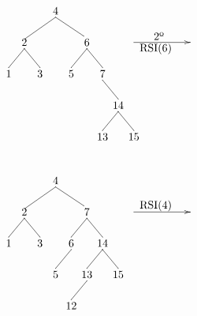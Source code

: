 \documentclass[10pt,a4paper,spanish]{report}
\begin{document}
\begin{minipage}{0.5\textwidth}
\[\begin{xy}
,(33,-8)*+=<10mm>[]\txt<2cm>{2º}
,(32,-12)*+=<20mm>[]\txt<2cm>{RSI(6)}
,(0,0)*+=<10mm>[]\txt<2cm>{4}
,(-10,-10)*+=<10mm>[]\txt<2cm>{2}
,(10,-10)*+=<10mm>[]\txt<2cm>{6}
,(-15,-20)*+=<10mm>[]\txt<2cm>{1}
,(-5,-20)*+=<10mm>[]\txt<2cm>{3}
,(5,-20)*+=<10mm>[]\txt<2cm>{5}
,(15,-20)*+=<10mm>[]\txt<2cm>{7}
,(20,-30)*+=<10mm>[]\txt<2cm>{14}
,(15,-40)*+=<10mm>[]\txt<2cm>{13}
,(25,-40)*+=<10mm>[]\txt<2cm>{15}

\ar@{->} (25,-10);(43,-10)
\ar@{-} (0,-2);(-10,-9) %
\ar@{-} (0,-2);(9,-8) %
\ar@{-} (-10,-12);(-15,-18) %
\ar@{-} (10,-12);(5,-18) %
\ar@{-} (10,-12);(15,-18) %
\ar@{-} (-10,-12);(-5,-18) %
\ar@{-} (15,-22);(20,-28)
\ar@{-} (20,-32);(15,-38)
\ar@{-} (20,-32);(25,-38)
\end{xy}\]
\end{minipage}
\begin{minipage}{0.5\textwidth}
\[\begin{xy}
,(32,-8)*+=<20mm>[]\txt<2cm>{RSI(4)}
,(0,0)*+=<10mm>[]\txt<2cm>{4}
,(-10,-10)*+=<10mm>[]\txt<2cm>{2}
,(10,-10)*+=<10mm>[]\txt<2cm>{7}
,(-15,-20)*+=<10mm>[]\txt<2cm>{1}
,(-5,-20)*+=<10mm>[]\txt<2cm>{3}
,(5,-20)*+=<10mm>[]\txt<2cm>{6}
,(15,-20)*+=<10mm>[]\txt<2cm>{14}
,(0,-30)*+=<10mm>[]\txt<2cm>{5}
,(20,-30)*+=<10mm>[]\txt<2cm>{15}
,(10,-30)*+=<10mm>[]\txt<2cm>{13}
,(5,-40)*+=<10mm>[]\txt<2cm>{12}

\ar@{->} (25,-10);(43,-10)
\ar@{-} (0,-2);(-10,-9) %
\ar@{-} (0,-2);(9,-8) %
\ar@{-} (-10,-12);(-15,-18) %
\ar@{-} (10,-12);(5,-18) %
\ar@{-} (10,-12);(15,-18) %
\ar@{-} (-10,-12);(-5,-18) %
\ar@{-} (5,-22);(0,-28)
\ar@{-} (15,-22);(20,-28)
\ar@{-} (15,-22);(10,-28)
\ar@{-} (10,-32);(5,-38)
\end{xy}\]
\end{minipage}
\end{document}
